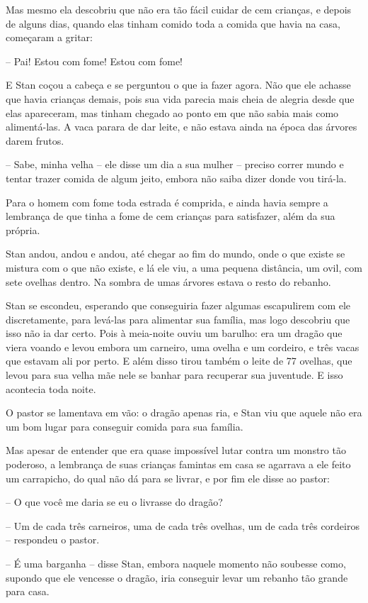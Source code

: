 Mas mesmo ela descobriu que não era tão fácil cuidar de cem crianças,
e depois de alguns dias, quando elas tinham comido toda a comida que
havia na casa, começaram a gritar:

-- Pai! Estou com fome! Estou com fome! 

E Stan coçou a cabeça e se perguntou o que ia fazer agora. Não que ele
achasse que havia crianças demais, pois sua vida parecia mais cheia
de alegria desde que elas apareceram, mas tinham chegado ao ponto em
que não sabia mais como alimentá-las. A vaca parara de dar leite, e
não estava ainda na época das árvores darem frutos.

-- Sabe, minha velha -- ele disse um dia a sua mulher -- preciso correr
mundo e tentar trazer comida de algum jeito, embora não saiba dizer
donde vou tirá-la.

Para o homem com fome toda estrada é comprida, e ainda havia sempre a
lembrança de que tinha a fome de cem crianças para satisfazer, além
da sua própria.

Stan andou, andou e andou, até chegar ao fim do mundo, onde o que
existe se mistura com o que não existe, e lá ele viu, a uma pequena
distância, um ovil, com sete ovelhas dentro. Na sombra de umas
árvores estava o resto do rebanho.

Stan se escondeu, esperando que conseguiria fazer algumas escapulirem
com ele discretamente, para levá-las para alimentar sua família, mas
logo descobriu que isso não ia dar certo. Pois à meia-noite ouviu um
barulho: era um dragão que viera voando e levou embora um carneiro,
uma ovelha e um cordeiro, e três vacas que estavam ali por perto. E
além disso tirou também o leite de 77 ovelhas, que levou para sua
velha mãe nele se banhar para recuperar sua juventude. E isso
acontecia toda noite.

O pastor se lamentava em vão: o dragão apenas ria, e Stan viu que
aquele não era um bom lugar para conseguir comida para sua família.

Mas apesar de entender que era quase impossível lutar contra um
monstro tão poderoso, a lembrança de suas crianças famintas em casa
se agarrava a ele feito um carrapicho, do qual não dá para se livrar,
e por fim ele disse ao pastor:

-- O que você me daria se eu o livrasse do dragão?

-- Um de cada três carneiros, uma de cada três ovelhas, um de cada três
cordeiros -- respondeu o pastor.

-- É uma barganha -- disse Stan, embora naquele momento não soubesse
como, supondo que ele vencesse o dragão, iria conseguir levar um
rebanho tão grande para casa.

